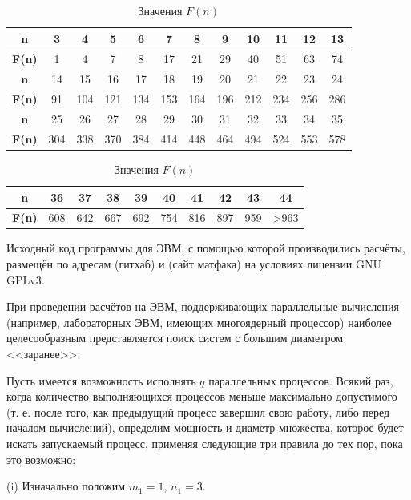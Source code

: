 \documentclass{article}
\begin{document}
\begin{table}[H]
\caption{Значения $F(n)$}
\label{tabular:pc_counted}
\begin{center}
\begin{tabular}{|c|c|c|c|c|c|c|c|c|c|c|c|}
\hline
\textbf{n}    &  3 & 4 & 5 & 6 &  7 &  8 &  9 & 10 & 11 & 12 & 13 \\
\hline
\textbf{F(n)} &  1 & 4 & 7 & 8 & 17 & 21 & 29 & 40 & 51 & 63 & 74  \\
\hline
\hline
\textbf{n}    &  14 &  15 &  16 &  17 &  18 &  19 &  20 &  21 &  22 &  23 &  24 \\
\hline
\textbf{F(n)} &  91 & 104 & 121 & 134 & 153 & 164 & 196 & 212 & 234 & 256 & 286  \\
\hline
\hline
\textbf{n}    &  25 &  26 &  27 &  28 &  29 &  30 &  31 &  32 &  33 &  34 &  35 \\
\hline
\textbf{F(n)} & 304 & 338 & 370 & 384 & 414 & 448 & 464 & 494 & 524 & 553 & 578  \\
\hline
\end{tabular}
\begin{tabular}{|c|c|c|c|c|c|c|c|c|c|}
\hline
\textbf{n}    &  36 &  37 &  38 &  39 &  40 &  41 &  42 &  43 & 44 \\

\hline
\textbf{F(n)} & 608 & 642 & 667 & 692 & 754 & 816 & 897 & 959 & >963 \\
\hline
\end{tabular}
\end{center}
\end{table}


Исходный код программы для ЭВМ, с помощью которой производились расчёты, размещён по адресам (гитхаб) и (сайт матфака) на условиях лицензии GNU GPLv3. 


При проведении расчётов на ЭВМ, поддерживающих параллельные вычисления (например, лабораторных ЭВМ, имеющих многоядерный процессор) наиболее целесообразным представляется поиск систем с большим диаметром <<заранее>>.

Пусть имеется возможность исполнять $q$ параллельных процессов.
Всякий раз, когда количество выполняющихся процессов меньше максимально допустимого (т. е. после того, как предыдущий процесс завершил свою работу, либо перед началом вычислений), определим мощность и диаметр множества, которое будет искать запускаемый процесс, применяя следующие три правила до тех пор, пока это возможно:

(i)
Изначально положим $m_1=1$, $n_1=3$.
\end{document}
